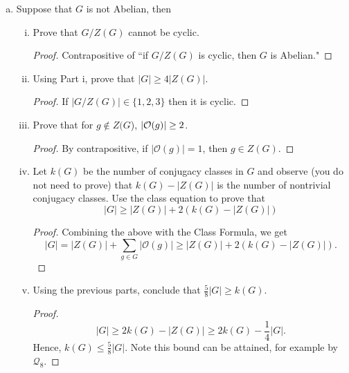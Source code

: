 \begin{itemize}
\begin{enumerate}[(a)]
\begin{enumerate}[(i)]
        \item Prove that the number of conjugacy classes of $G$ is at least $\frac{|H|^2}{|G|}$.
        \begin{proof}
            Follows from ai) and bi)
        \end{proof}
    \end{enumerate}

\item Suppose that $G$ is not Abelian, then
    \begin{enumerate}[(i)]
        \item Prove that $G/Z(G)$ cannot be cyclic.
        \begin{proof}
            Contrapositive of ``if $G/Z(G)$ is cyclic, then $G$ is Abelian."
        \end{proof}
        
        \item Using Part i, prove that $|G| \geq 4|Z(G)|$.
        \begin{proof}
            If $|G/Z(G)| \in \{1,2,3\}$ then it is cyclic. 
        \end{proof}
        
        \item Prove that for $g \not\in Z(G$), $|\mathcal{O}(g)| \geq 2$.
        \begin{proof}
             By contrapositive, if $|\mathcal{O}(g)| = 1$, then $g \in Z(G)$.
        \end{proof}
        
        \item Let $k(G)$ be the number of conjugacy classes in $G$ and observe
        (you do not need to prove) that $k(G)-|Z(G)|$ is the number of nontrivial
        conjugacy classes. Use the class equation to prove that
        $$|G| \geq |Z(G)| + 2(k(G)-|Z(G)|)$$
        \begin{proof}
            Combining the above with the Class Formula, we get $$|G| = |Z(G)| + \sum_{g \in G}|\mathcal{O}(g)| \geq |Z(G)| + 2(k(G) - |Z(G)|).$$
        \end{proof}
        
        \item Using the previous parts, conclude that $\frac{5}{8}|G| \geq k(G)$.
        \begin{proof}
            $$|G| \geq 2k(G) - |Z(G)| \geq 2k(G) - \frac{1}{4} |G|.$$
            Hence, $k(G) \leq \frac{5}{8}|G|$. Note this bound can be attained, for example by $\mathcal{Q}_8$.
            \medskip  
            

\end{proof}
\end{enumerate}
\end{enumerate}
\end{itemize}
